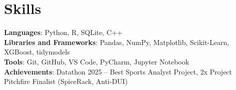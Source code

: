 \documentclass[letterpaper,11pt]{article}
\begin{document}
\section{Skills}
 \begin{itemize}[leftmargin=0.15in, label={}]
    \small{\item{
     \textbf{Languages}{: Python, R, SQLite, C++} \\
     \textbf{Libraries and Frameworks}{: Pandas, NumPy, Matplotlib, Scikit-Learn, XGBoost, tidymodels} \\
     \textbf{Tools}{: Git, GitHub, VS Code, PyCharm, Jupyter Notebook} \\
     \textbf{Achievements}{: Datathon 2025 -- Best Sports Analyst Project, 2x Project Pitchfire Finalist (SpiceRack, Anti-DUI)}    }}
 \end{itemize}
 
\end{document}
